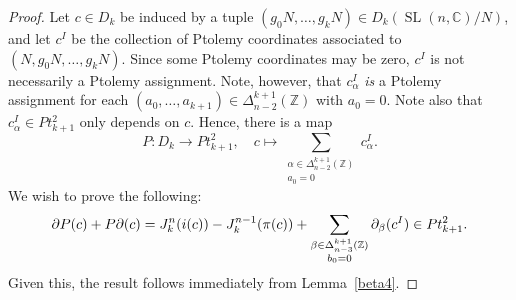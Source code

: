 \documentclass[11pt]{amsart}
\theoremstyle{definition}
\numberwithin{equation}{section}
\def\printname#1{
        \if\draft y
                \smash{\makebox[0pt]{\hspace{-0.5in}
                        \raisebox{8pt}{\tt\tiny #1}}}
        \fi
}
\def\lbl#1{\label{#1}\printname{#1}}
\DeclareMathOperator{\SL}{SL}
\newcommand{\C}{\mathbb C}
\newcommand{\Z}{\mathbb Z}
\def\a{\alpha}
\def\b{\beta}
\begin{document}
\begin{proof} 
Let $c\in D_k$ be induced by a tuple $(g_0N,\dots,g_kN)\in D_k(\SL(n,\C)/N)$, 
and let $c^I$ be the collection of Ptolemy coordinates associated to 
$(N,g_0N,\dots,g_kN)$. Since some Ptolemy coordinates may be zero, $c^I$ 
is not necessarily a Ptolemy assignment. Note, however, that $c^I_\alpha$ \emph{is} a Ptolemy assignment for each $(a_0,\dots,a_{k+1})\in \Delta^{k+1}_{n-2}(\Z)$ with $a_0=0$. Note also that $c^I_\alpha\in Pt_{k+1}^2$ only depends on $c$.
Hence, there is a map 
\begin{equation}
P\colon D_k\to Pt_{k+1}^2,\quad c\mapsto \sum_{\substack{\alpha\in \Delta^{k+1}_{n-2}(\Z)\\a_0=0}}c^I_{\alpha}.
\end{equation}
We wish to prove the following:
\begin{equation}\lbl{theresult}
\partial P(c)+P\partial(c)=J_k^n(i(c))-J_k^{n-1}(\pi(c))+\sum_{\substack{\beta\in \Delta^{k+1}_{n-3}(\Z)\\b_0=0}}\partial_\beta(c^I)\in Pt_{k+1}^2.
\end{equation}
Given this, the result follows immediately from Lemma~\ref{beta4}. 


\end{proof}
\end{document}
